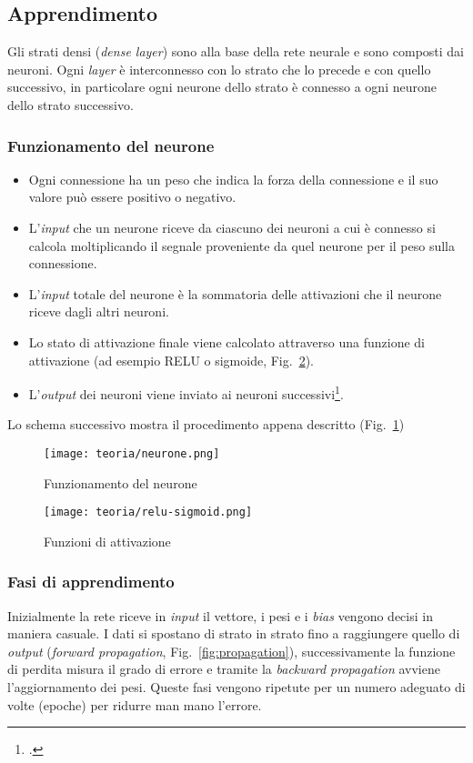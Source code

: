 \subsection{Apprendimento}
Gli strati densi (\emph{dense layer}) sono alla base della rete neurale e sono composti dai neuroni.
Ogni \emph{layer} è interconnesso con lo strato che lo precede e con quello successivo, in particolare ogni neurone dello strato è connesso a ogni neurone dello strato successivo.

\subsubsection{Funzionamento del neurone}

\begin{itemize}
    \item Ogni connessione ha un peso che indica la forza della connessione e il suo valore può essere positivo o negativo.
    \item L'\emph{input} che un neurone riceve da ciascuno dei neuroni a cui è connesso si calcola moltiplicando il segnale proveniente da quel neurone per il peso sulla connessione.
    \item L'\emph{input} totale del neurone è la sommatoria delle attivazioni che il neurone riceve dagli altri neuroni.
    \item Lo stato di attivazione finale viene calcolato attraverso una funzione di attivazione (ad esempio RELU o sigmoide, Fig.~\ref{fig:relu-sigmoid}).
    \item L'\emph{output} dei neuroni viene inviato ai neuroni successivi\footcite{LectureA}.
\end{itemize}
Lo schema successivo mostra il procedimento appena descritto (Fig.~\ref{fig:neurone})

\begin{figure}[!h] 
    \centering 
    \texttt{[image: teoria/neurone.png]} 
    \caption{Funzionamento del neurone}
    \label{fig:neurone}
  \end{figure}

  \begin{figure}[!h] 
    \centering 
    \texttt{[image: teoria/relu-sigmoid.png]} 
    \caption{Funzioni di attivazione}
    \label{fig:relu-sigmoid}
  \end{figure}

\newpage

\subsubsection{Fasi di apprendimento} 
Inizialmente la rete riceve in \emph{input} il vettore, i pesi e i \emph{bias} vengono decisi in maniera casuale.
I dati si spostano di strato in strato fino a raggiungere quello di \emph{output} (\emph{forward propagation}, Fig.~\ref{fig:propagation}), successivamente la funzione di perdita misura il grado di errore e tramite la \emph{backward propagation} avviene l'aggiornamento dei pesi.
Queste fasi vengono ripetute per un numero adeguato di volte (epoche) per ridurre man mano l'errore.

